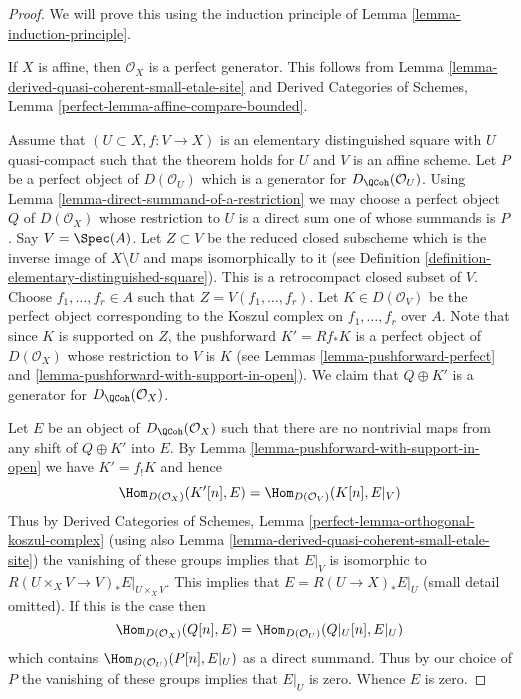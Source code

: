 \begin{proof}
We will prove this using the induction principle of
Lemma \ref{lemma-induction-principle}.

\medskip\noindent
If $X$ is affine, then $\mathcal{O}_X$ is a perfect generator.
This follows from Lemma \ref{lemma-derived-quasi-coherent-small-etale-site}
and
Derived Categories of Schemes,
Lemma \ref{perfect-lemma-affine-compare-bounded}.

\medskip\noindent
Assume that $(U \subset X, f : V \to X)$ is an elementary distinguished
square with $U$ quasi-compact such that the theorem holds for $U$ and $V$
is an affine scheme.
Let $P$ be a perfect object of $D(\mathcal{O}_U)$ which is a generator
for $D_\QCoh(\mathcal{O}_U)$. Using
Lemma \ref{lemma-direct-summand-of-a-restriction} we may
choose a perfect object
$Q$ of $D(\mathcal{O}_X)$ whose restriction to $U$ is a direct sum one
of whose summands is $P$. Say $V = \Spec(A)$. Let $Z \subset V$
be the reduced closed subscheme which is the inverse image of
$X \setminus U$ and maps isomorphically to it
(see Definition \ref{definition-elementary-distinguished-square}).
This is a retrocompact closed subset of $V$.
Choose $f_1, \ldots, f_r \in A$ such that
$Z = V(f_1, \ldots, f_r)$. Let $K \in D(\mathcal{O}_V)$ be the perfect
object corresponding to the Koszul complex on $f_1, \ldots, f_r$ over $A$.
Note that since $K$ is supported on $Z$, the pushforward
$K' = Rf_*K$ is a perfect object of $D(\mathcal{O}_X)$ whose
restriction to $V$ is $K$ (see Lemmas \ref{lemma-pushforward-perfect}
and \ref{lemma-pushforward-with-support-in-open}).
We claim that $Q \oplus K'$ is a generator for
$D_\QCoh(\mathcal{O}_X)$.

\medskip\noindent
Let $E$ be an object of $D_\QCoh(\mathcal{O}_X)$ such that
there are no nontrivial maps from any shift of $Q \oplus K'$ into $E$.
By Lemma \ref{lemma-pushforward-with-support-in-open}
we have $K' =  f_! K$ and hence
$$
\Hom_{D(\mathcal{O}_X)}(K'[n], E) = \Hom_{D(\mathcal{O}_V)}(K[n], E|_V)
$$
Thus by
Derived Categories of Schemes,
Lemma \ref{perfect-lemma-orthogonal-koszul-complex}
(using also
Lemma \ref{lemma-derived-quasi-coherent-small-etale-site})
the vanishing of these groups implies that $E|_V$ is isomorphic to
$R(U \times_X V \to V)_*E|_{U \times_X V}$. This implies that
$E = R(U \to X)_*E|_U$ (small detail omitted). If this is the case then
$$
\Hom_{D(\mathcal{O}_X)}(Q[n], E) = \Hom_{D(\mathcal{O}_U)}(Q|_U[n], E|_U)
$$
which contains $\Hom_{D(\mathcal{O}_U)}(P[n], E|_U)$ as a direct summand.
Thus by our choice of $P$ the vanishing of these groups implies that $E|_U$
is zero. Whence $E$ is zero.
\end{proof}

